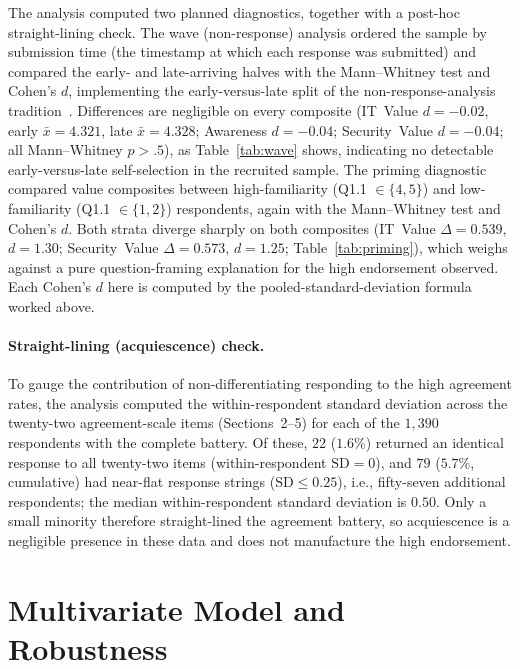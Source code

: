 The analysis computed two planned diagnostics, together with a post-hoc straight-lining check. The wave (non-response) analysis ordered the sample by submission time (the timestamp at which each response was submitted) and compared the early- and late-arriving halves with the Mann--Whitney test and Cohen's $d$, implementing the early-versus-late split of the non-response-analysis tradition~\parencite{Armstrong_Overton_1977}. Differences are negligible on every composite (IT~Value $d=-0.02$, early $\bar{x}=4.321$, late $\bar{x}=4.328$; Awareness $d=-0.04$; Security~Value $d=-0.04$; all Mann--Whitney $p>.5$), as Table~\ref{tab:wave} shows, indicating no detectable early-versus-late self-selection in the recruited sample. The priming diagnostic compared value composites between high-familiarity (Q1.1 $\in\{4,5\}$) and low-familiarity (Q1.1 $\in\{1,2\}$) respondents, again with the Mann--Whitney test and Cohen's $d$. Both strata diverge sharply on both composites (IT~Value $\Delta=0.539$, $d=1.30$; Security~Value $\Delta=0.573$, $d=1.25$; Table~\ref{tab:priming}), which weighs against a pure question-framing explanation for the high endorsement observed. Each Cohen's $d$ here is computed by the pooled-standard-deviation formula worked above.

\paragraph{Straight-lining (acquiescence) check.} To gauge the contribution of non-differentiating responding to the high agreement rates, the analysis computed the within-respondent standard deviation across the twenty-two agreement-scale items (Sections~2--5) for each of the $1{,}390$ respondents with the complete battery. Of these, $22$ ($1.6\%$) returned an identical response to all twenty-two items (within-respondent $\mathrm{SD}=0$), and $79$ ($5.7\%$, cumulative) had near-flat response strings ($\mathrm{SD}\le0.25$), i.e., fifty-seven additional respondents; the median within-respondent standard deviation is $0.50$. Only a small minority therefore straight-lined the agreement battery, so acquiescence is a negligible presence in these data and does not manufacture the high endorsement.

\section{Multivariate Model and Robustness}

